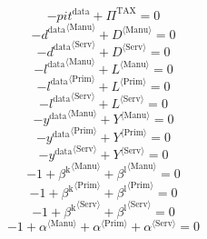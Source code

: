 \begin{equation}
-{p\!i\!t}^{\mathrm{data}} + \Pi^{\mathrm{TAX}} = 0
\end{equation}
\begin{equation}
-{d^{\mathrm{data}}}^{\langle \mathrm{\mathrm{Manu}}\rangle} + {D}^{\langle \mathrm{Manu}\rangle} = 0
\end{equation}
\begin{equation}
-{d^{\mathrm{data}}}^{\langle \mathrm{\mathrm{Serv}}\rangle} + {D}^{\langle \mathrm{Serv}\rangle} = 0
\end{equation}
\begin{equation}
-{l^{\mathrm{data}}}^{\langle \mathrm{\mathrm{Manu}}\rangle} + {L}^{\langle \mathrm{Manu}\rangle} = 0
\end{equation}
\begin{equation}
-{l^{\mathrm{data}}}^{\langle \mathrm{\mathrm{Prim}}\rangle} + {L}^{\langle \mathrm{Prim}\rangle} = 0
\end{equation}
\begin{equation}
-{l^{\mathrm{data}}}^{\langle \mathrm{\mathrm{Serv}}\rangle} + {L}^{\langle \mathrm{Serv}\rangle} = 0
\end{equation}
\begin{equation}
-{y^{\mathrm{data}}}^{\langle \mathrm{\mathrm{Manu}}\rangle} + {Y}^{\langle \mathrm{Manu}\rangle} = 0
\end{equation}
\begin{equation}
-{y^{\mathrm{data}}}^{\langle \mathrm{\mathrm{Prim}}\rangle} + {Y}^{\langle \mathrm{Prim}\rangle} = 0
\end{equation}
\begin{equation}
-{y^{\mathrm{data}}}^{\langle \mathrm{\mathrm{Serv}}\rangle} + {Y}^{\langle \mathrm{Serv}\rangle} = 0
\end{equation}
\begin{equation}
-1 + {\beta^{\mathrm{k}}}^{\langle \mathrm{\mathrm{Manu}}\rangle} + {\beta^{\mathrm{l}}}^{\langle \mathrm{\mathrm{Manu}}\rangle} = 0
\end{equation}
\begin{equation}
-1 + {\beta^{\mathrm{k}}}^{\langle \mathrm{\mathrm{Prim}}\rangle} + {\beta^{\mathrm{l}}}^{\langle \mathrm{\mathrm{Prim}}\rangle} = 0
\end{equation}
\begin{equation}
-1 + {\beta^{\mathrm{k}}}^{\langle \mathrm{\mathrm{Serv}}\rangle} + {\beta^{\mathrm{l}}}^{\langle \mathrm{\mathrm{Serv}}\rangle} = 0
\end{equation}
\begin{equation}
-1 + {\alpha}^{\langle \mathrm{\mathrm{Manu}}\rangle} + {\alpha}^{\langle \mathrm{\mathrm{Prim}}\rangle} + {\alpha}^{\langle \mathrm{\mathrm{Serv}}\rangle} = 0
\end{equation}





